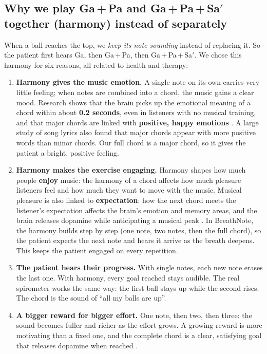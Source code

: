 \documentclass[12pt,a4paper]{article}
\newcommand{\Sah}{Sa\ensuremath{'}}     %
\begin{document}
\subsection{Why we play Ga\,+\,Pa and Ga\,+\,Pa\,+\,\Sah{} together (harmony) instead of separately}
\label{sec:whyharmony}

When a ball reaches the top, we \emph{keep its note sounding} instead of replacing it. So the patient first hears Ga, then Ga\,+\,Pa, then Ga\,+\,Pa\,+\,\Sah{}. We chose this harmony for six reasons, all related to health and therapy:

\begin{enumerate}
  \item \textbf{Harmony gives the music emotion.} A single note on its own carries very little feeling; when notes are combined into a chord, the music gains a clear mood. Research shows that the brain picks up the emotional meaning of a chord within about \textbf{0.2 seconds}, even in listeners with no musical training, and that major chords are linked with \textbf{positive, happy emotions} \cite{bakker}. A large study of song lyrics also found that major chords appear with more positive words than minor chords. Our full chord is a major chord, so it gives the patient a bright, positive feeling.
  \item \textbf{Harmony makes the exercise engaging.} Harmony shapes how much people \textbf{enjoy} music: the harmony of a chord affects how much pleasure listeners feel and how much they want to move with the music. Musical pleasure is also linked to \textbf{expectation}: how the next chord meets the listener's expectation affects the brain's emotion and memory areas, and the brain releases dopamine while anticipating a musical peak \cite{salimpoor}. In BreathNote, the harmony builds step by step (one note, two notes, then the full chord), so the patient expects the next note and hears it arrive as the breath deepens. This keeps the patient engaged on every repetition.
  \item \textbf{The patient hears their progress.} With single notes, each new note erases the last one. With harmony, every goal reached stays audible. The real spirometer works the same way: the first ball stays up while the second rises. The chord is the sound of ``all my balls are up''.
  \item \textbf{A bigger reward for bigger effort.} One note, then two, then three: the sound becomes fuller and richer as the effort grows. A growing reward is more motivating than a fixed one, and the complete chord is a clear, satisfying goal that releases dopamine when reached \cite{salimpoor}.

\end{enumerate}
\end{document}
